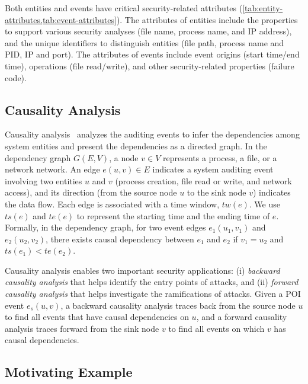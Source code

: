 Both entities and events have critical security-related
attributes (\cref{tab:entity-attributes,tab:event-attributes}).
The attributes of entities include the properties to support various security analyses
(\eg file name, process name, and IP address), and the
unique identifiers to distinguish entities (\eg file path, process name and PID, IP and port).
The attributes of events include event
origins (\eg start time/end time), operations (\eg file read/write), and other security-related properties (\eg failure code). 

\subsection{Causality Analysis}
\label{subsec:causality-analysis}

Causality analysis~\cite{backtracking,backtracking2,taser,intrusionrecovery,liu2018priotracker} analyzes the auditing events to infer the dependencies among system entities and present the dependencies as a directed graph.
%
In the dependency graph $G(E,V)$, a node $v \in V$ represents a process, a file, or a network network.
An edge $e(u, v) \in E$ indicates a system auditing event involving two entities $u$ and $v$ (\eg process creation, file read or write, and network access), and its direction (from the source node $u$ to the sink node $v$) indicates the data flow.
Each edge is associated with a time window, $tw(e)$.
We use $ts(e)$ and $te(e)$ to represent the starting time and the ending time of $e$.
Formally, in the dependency graph, for two event edges $e_1(u_1, v_1) $ and $e_2(u_2, v_2)$, there exists causal dependency between $e_1$ and $e_2$ if $v_1 = u_2$ and $ts(e_1) < te(e_2)$.

Causality analysis enables two important security applications:
(i) \emph{backward causality analysis} that helps identify the entry points of attacks, and (ii) \emph{forward causality analysis} that helps investigate the ramifications of attacks.
Given a POI event $e_s(u,v)$, a backward causality analysis traces back from the source node $u$ to find all events that have causal dependencies on $u$,
and a forward causality analysis traces forward from the sink node $v$ to find all events on which $v$ has causal dependencies.








\subsection{Motivating Example}
\label{subsec:motivating-example}

